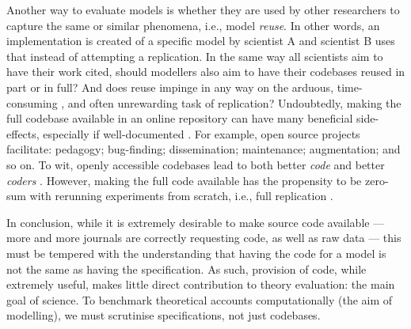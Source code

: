 \documentclass[jou]{apa6}
\begin{document}
Another way to evaluate models is whether they are used by other researchers to capture the same or similar phenomena, i.e., model \emph{reuse}.
In other words, an implementation is created of a specific model by scientist A and scientist B uses that instead of attempting a replication.
In the same way all scientists aim to have their work cited, should modellers also aim to have their codebases reused in part or in full?
And does reuse impinge in any way on the arduous, time-consuming \cite<for example, see:>{topalidou15}, and often unrewarding task of replication?
Undoubtedly, making the full codebase available in an online repository can have many beneficial side-effects, especially if well-documented  \cite{hucka16}.
For example, open source projects facilitate: pedagogy; bug-finding; dissemination; maintenance; augmentation; and so on.
To wit, openly accessible codebases lead to both better \emph{code} and better \emph{coders} \cite{easterbrook14}.
However, making the full code available has the propensity to be zero-sum with rerunning experiments from scratch, i.e., full replication \cite<similar points raised in:>{cooper14,drummond09}.

In conclusion, while it is extremely desirable to make source code available --- more and more journals are correctly requesting code, as well as raw data --- this must be tempered with the understanding that having the code for a model is not the same as having the specification.
As such, provision of code, while extremely useful, makes little direct contribution to theory evaluation: the main goal of science.
To benchmark theoretical accounts computationally (the aim of modelling), we must scrutinise specifications, not just codebases.



\end{document}
